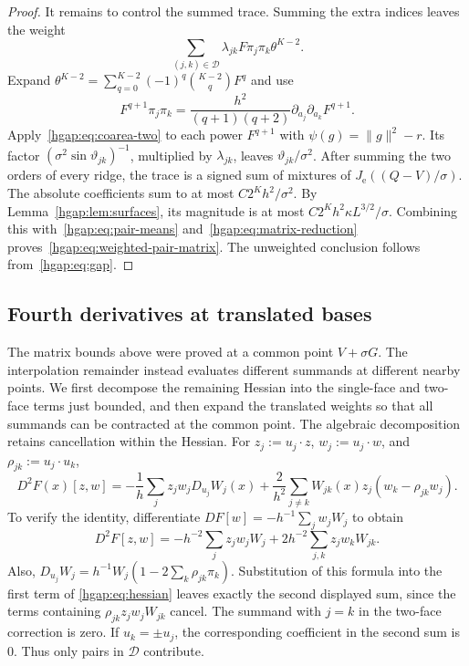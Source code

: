 \documentclass[11pt,letterpaper]{article}
\theoremstyle{remark}
\newcommand{\cD}{\mathcal D}
\begin{document}
\begin{proof}
It remains to control the summed trace. Summing the extra indices
leaves the weight
\[
 \sum_{(j,k)\in\cD}\lambda_{jk}F\pi_j\pi_k\theta^{K-2}.
\]
Expand
$\theta^{K-2}=\sum_{q=0}^{K-2}(-1)^q\binom{K-2}{q}F^q$ and use
\[
 F^{q+1}\pi_j\pi_k
 =\frac{h^2}{(q+1)(q+2)}
       \partial_{a_j}\partial_{a_k}F^{q+1}.
\]
Apply~\eqref{hgap:eq:coarea-two} to each power $F^{q+1}$ with
$\psi(g)=\|g\|^2-r$. Its factor
$(\sigma^2\sin\vartheta_{jk})^{-1}$, multiplied by
$\lambda_{jk}$, leaves $\vartheta_{jk}/\sigma^2$.
After summing the two orders of every ridge, the trace is a signed
sum of mixtures of $J_{\mathrm e}((Q-V)/\sigma)$.
The absolute coefficients sum to at most $C2^Kh^2/\sigma^2$.
By Lemma~\ref{hgap:lem:surfaces}, its magnitude is at most
$C2^K h^2\kappa L^{3/2}/\sigma$. Combining this with~\eqref{hgap:eq:pair-means}
and~\eqref{hgap:eq:matrix-reduction} proves~\eqref{hgap:eq:weighted-pair-matrix}.
The unweighted conclusion follows from~\eqref{hgap:eq:gap}.
\end{proof}

\subsection{Fourth derivatives at translated bases}\label{hgap:sec:translated}

The matrix bounds above were proved at a common point $V+\sigma G$.
The interpolation remainder instead evaluates different summands at
different nearby points. We first decompose the remaining Hessian
into the single-face and two-face terms just bounded, and then expand
the translated weights so that all summands can be contracted at the
common point.
The algebraic decomposition retains cancellation within the Hessian.
For $z_j:=u_j\cdot z$, $w_j:=u_j\cdot w$, and
$\rho_{jk}:=u_j\cdot u_k$,
\begin{equation}
 D^2F(x)[z,w]
 =-\frac1h\sum_j z_jw_jD_{u_j}W_j(x)
 +\frac2{h^2}\sum_{j\ne k}W_{jk}(x)z_j(w_k-\rho_{jk}w_j).
 \label{hgap:eq:hessian}
\end{equation}
To verify the identity, differentiate $D F[w]=-h^{-1}\sum_jw_jW_j$
to obtain
\[
 D^2F[z,w]=-h^{-2}\sum_jz_jw_jW_j
                    +2h^{-2}\sum_{j,k}z_jw_kW_{jk}.
\]
Also,
$D_{u_j}W_j=h^{-1}W_j(1-2\sum_k\rho_{jk}\pi_k)$.
Substitution of this formula into the first term of
\eqref{hgap:eq:hessian} leaves exactly the second displayed sum,
since the terms containing $\rho_{jk}z_jw_jW_{jk}$ cancel.
The summand with $j=k$ in the two-face correction is zero.
If $u_k=\pm u_j$, the corresponding coefficient in the second sum is
$0$. Thus only pairs in $\cD$ contribute.
\end{document}
